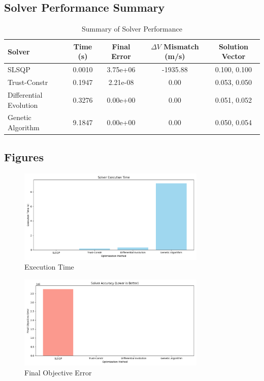 \documentclass{article}
\begin{document}
\subsection*{Solver Performance Summary}
\begin{table}[ht]
\centering
\begin{tabular}{lcccc}
\toprule
\textbf{Solver} & \textbf{Time (s)} & \textbf{Final Error} & \textbf{$\Delta V$ Mismatch (m/s)} & \textbf{Solution Vector} \\
\midrule
SLSQP & 0.0010 & 3.75e+06 & -1935.88 & 0.100, 0.100 \\
Trust-Constr & 0.1947 & 2.21e-08 & 0.00 & 0.053, 0.050 \\
Differential Evolution & 0.3276 & 0.00e+00 & 0.00 & 0.051, 0.052 \\
Genetic Algorithm & 9.1847 & 0.00e+00 & 0.00 & 0.050, 0.054 \\
\bottomrule
\end{tabular}
\caption{Summary of Solver Performance}
\end{table}

\subsection*{Figures}

\begin{figure}[ht]
\centering
\includegraphics[width=0.8\textwidth]{execution_time.png}
\caption{Execution Time}
\end{figure}

\begin{figure}[ht]
\centering
\includegraphics[width=0.8\textwidth]{objective_error.png}
\caption{Final Objective Error}
\end{figure}
\end{document}
